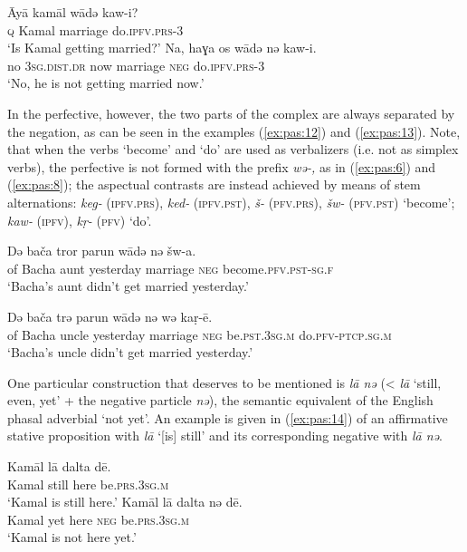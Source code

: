 \documentclass[output=paper,colorlinks,citecolor=brown]{langscibook}
\begin{document}
\ea\label{ex:pas:11}
    \ea\label{ex:pas:11a}
        \gll Āy\={a}  kamāl wādə kaw-i?\\
             \textsc{q} Kamal marriage do.\textsc{ipfv.prs{}-3}\\
        \glt ‘Is Kamal getting married?’
    \ex\label{ex:pas:11b}
        \gll Na, haɣa os wādə nə kaw-i.\\
             no \textsc{3sg.dist.dr} now marriage \textsc{neg} do.\textsc{ipfv.prs-3}\\
        \glt ‘No, he is not getting married now.’
    \z
\z 

In the perfective, however, the two parts of the complex are always separated by the negation, as can be seen in the examples (\ref{ex:pas:12}) and (\ref{ex:pas:13}). Note, that when the verbs ‘become’ and ‘do’ are used as verbalizers (i.e. not as simplex verbs), the perfective is not formed with the prefix \textit{wə{}-,} as in (\ref{ex:pas:6}) and (\ref{ex:pas:8}); the aspectual contrasts are instead achieved by means of stem alternations: \textit{keg-} (\textsc{ipfv.prs}), \textit{ked{}-} (\textsc{ipfv.pst}), \textit{š-} (\textsc{pfv.prs}), \textit{šw-} (\textsc{pfv.pst}) ‘become’; \textit{kaw-} (\textsc{ipfv}), \textit{kṛ{}-} (\textsc{pfv}) ‘do’.

\ea\label{ex:pas:12} 
    \gll  Də bača tror parun wādə nə šw{}-a.\\ 
         of Bacha aunt yesterday marriage \textsc{neg} become.\textsc{pfv.pst{}-sg.f}\\
    \glt ‘Bacha’s aunt didn’t get married yesterday.’
\z 

\ea\label{ex:pas:13} 
    \gll  Də bača trə parun wādə nə wə kaṛ{}-ē.\\ 
          of Bacha uncle yesterday marriage \textsc{neg} be.\textsc{pst.3sg.m} do.\textsc{pfv{}-ptcp.sg.m}\\
    \glt ‘Bacha’s uncle didn’t get married yesterday.’
\z 

One particular construction that deserves to be mentioned is \textit{l\={a} nə} (< \textit{l\={a}} ‘still, even, yet’ + the negative particle \textit{nə}), the semantic equivalent of the English phasal adverbial ‘not yet’. An example is given in (\ref{ex:pas:14}) of an affirmative stative proposition with \textit{l\={a}} ‘[is] still’ and its corresponding negative with \textit{l\={a} nə}.

\ea\label{ex:pas:14}
    \ea\label{ex:pas:14a}
        \gll Kam\={a}l l\={a}  dalta d\={e}.\\
             Kamal still here be.\textsc{prs.3sg.m}\\
        \glt ‘Kamal is still here.’
    \ex\label{ex:pas:14b}
        \gll Kam\={a}l l\={a}  dalta nə d\={e}. \\
             Kamal yet here \textsc{neg} be.\textsc{prs.3sg.m}\\
        \glt ‘Kamal is not here yet.’
    \z
\z 
\end{document}
